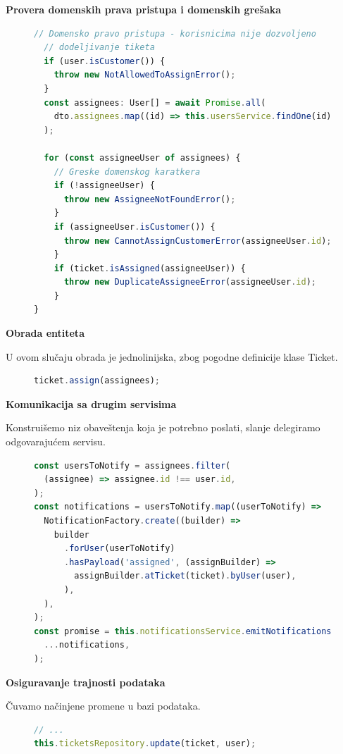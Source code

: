 \documentclass[12pt,oneside]{memoir}
\begin{document}
\textbf{Provera domenskih prava pristupa i domenskih grešaka}
\begin{figure}[h]
\begin{lstlisting}[language=JavaScript, style=ES6, caption={domenska prava pristupa i greške}]
  // Domensko pravo pristupa - korisnicima nije dozvoljeno
  // dodeljivanje tiketa
  if (user.isCustomer()) {
    throw new NotAllowedToAssignError();
  }
  const assignees: User[] = await Promise.all(
    dto.assignees.map((id) => this.usersService.findOne(id)),
  );

  for (const assigneeUser of assignees) {
    // Greske domenskog karatkera
    if (!assigneeUser) {
      throw new AssigneeNotFoundError();
    }
    if (assigneeUser.isCustomer()) {
      throw new CannotAssignCustomerError(assigneeUser.id);
    }
    if (ticket.isAssigned(assigneeUser)) {
      throw new DuplicateAssigneeError(assigneeUser.id);
    }
}
\end{lstlisting}
\end{figure}

\newpage
\textbf{Obrada entiteta}

U ovom slučaju obrada je jednolinijska, zbog pogodne definicije klase Ticket.
\begin{figure}[h]
\begin{lstlisting}[language=JavaScript, style=ES6, caption={obrada entiteta}]
ticket.assign(assignees);
\end{lstlisting}
\end{figure}

\textbf{Komunikacija sa drugim servisima}

Konstruišemo niz obaveštenja koja je potrebno poslati, slanje delegiramo odgovarajućem servisu.
\begin{figure}[h]
\begin{lstlisting}[language=JavaScript, style=ES6, caption={drugi servisi}]
const usersToNotify = assignees.filter(
  (assignee) => assignee.id !== user.id,
);
const notifications = usersToNotify.map((userToNotify) =>
  NotificationFactory.create((builder) =>
    builder
      .forUser(userToNotify)
      .hasPayload('assigned', (assignBuilder) =>
        assignBuilder.atTicket(ticket).byUser(user),
      ),
  ),
);
const promise = this.notificationsService.emitNotifications(
  ...notifications,
);
\end{lstlisting}
\end{figure}

\textbf{Osiguravanje trajnosti podataka}

Čuvamo načinjene promene u bazi podataka.
\begin{figure}[h]
\begin{lstlisting}[language=JavaScript, style=ES6, caption={trajnost}]
// ...
this.ticketsRepository.update(ticket, user);
\end{lstlisting}
\end{figure}
\end{document}
